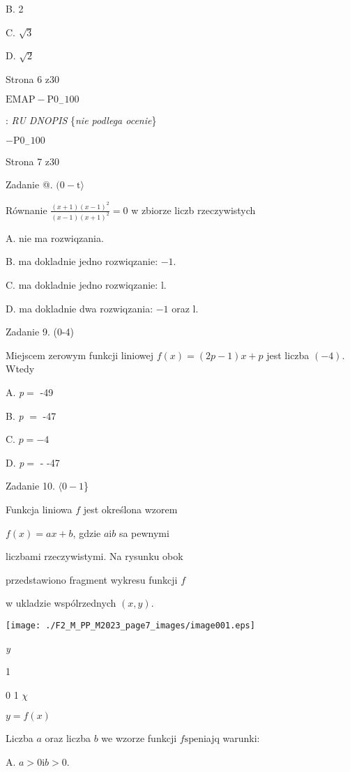 \documentclass[a4paper,12pt]{article}
\begin{document}
B. 2

C. $\sqrt{3}$

D. $\sqrt{2}$

Strona 6 z30

$\mathrm{E}\mathrm{M}\mathrm{A}\mathrm{P}-\mathrm{P}0_{-}100$





: {\it RU DNOPIS} \{{\it nie podlega ocenie}\}

$-\mathrm{P}0_{-}100$

Strona 7 z30





Zadanie @. $(0-\mathrm{t}\rangle$

Równanie $\displaystyle \frac{(x+1)(x-1)^{2}}{(x-1)(x+1)^{2}}=0$ w zbiorze liczb rzeczywistych

A. nie ma rozwiqzania.

B. ma dokladnie jedno rozwiqzanie: $-1.$

C. ma dokladnie jedno rozwiqzanie: l.

D. ma dokladnie dwa rozwiqzania: $-1$ oraz l.

Zadanie 9. (0-4)

Miejscem zerowym funkcji liniowej $f(x)=(2p-1)x+p$ jest liczba $(-4)$. Wtedy

A. {\it p}$=$ -49

B. {\it p} $=$ -47

C. $p=-4$

D. {\it p}$=$ - -47

Zadanie 10. $\langle 0-1$\}

Funkcja liniowa $f$ jest określona wzorem

$f(x)=ax+b$, gdzie $a \mathrm{i} b$ sa pewnymi

liczbami rzeczywistymi. Na rysunku obok

przedstawiono fragment wykresu funkcji $f$

w ukladzie wspólrzednych $(x,y).$
\begin{center}
\texttt{[image: ./F2\_M\_PP\_M2023\_page7\_images/image001.eps]}
\end{center}
{\it y}

1

0 1  $\chi$

$y=f(x)$

Liczba $a$ oraz liczba $b$ we wzorze funkcji $f \mathrm{s}\mathrm{p}\mathrm{e}$niajq warunki:

A. $a>0 \mathrm{i} b>0.$
\end{document}
